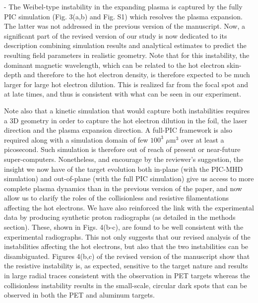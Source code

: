 \documentclass{article}
\begin{document}
\begin{enumerate}
- The Weibel-type instability    in the expanding plasma is    captured by the fully PIC simulation (Fig. 3(a,b) and Fig. S1)  which resolves the plasma expansion.
 The latter was not addressed in the previous version of the manuscript. Now, a significant part of the revised version of our study is now dedicated to its description combining simulation results and analytical estimates to predict the resulting field parameters in realistic geometry.
Note that for this instability,  the dominant magnetic wavelength, which can  be related to the hot electron skin-depth and therefore to the hot electron density, is therefore expected to be much larger for large hot electron dilution. 
This is realized far from the focal spot and at late times, and thus is consistent with what can be seen in our experiment.

Note also that a kinetic simulation that would capture both instabilities requires a 3D geometry in order to capture the hot electron dilution in the foil, the laser direction and the plasma expansion direction.  A full-PIC framework is also required along with a simulation domain of  few   $100^3$ $\mu$m$^3$   over at least a picosecond. Such simulation is therefore out of reach of present or near-future super-computers.
Nonetheless, and encourage by the reviewer’s suggestion, the insight we now have of the target evolution both in-plane (with the PIC-MHD simulation) and out-of-plane (with the full PIC simulation) give us access to more complete plasma dynamics than in the previous version of the paper, and now allow us to clarify the roles of the collisionless and resistive filamentations affecting the hot electrons.
We have also reinforced the link with the experimental data by producing synthetic proton radiographs (as detailed in the methods section). These, shown in Figs. 4(b-c), are found to be well consistent with the experimental radiographs. This not only suggests that our revised analysis of the instabilities affecting the hot electrons, but also that the two instabilities can be disambiguated.  Figures 4(b,c) of  the revised version of the manuscript show that the resistive instability is, as expected, sensitive to the target nature and results in large radial traces consistent with the observation in PET targets whereas  the collisionless instability  results in the small-scale, circular dark spots  that can be observed in both the PET and aluminum targets.

\end{enumerate}

\end{document}
